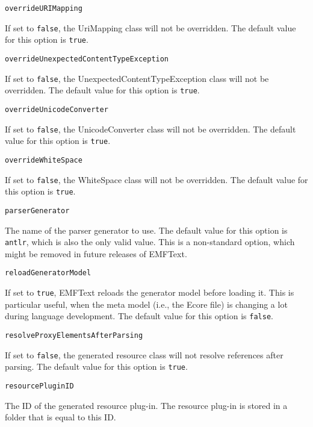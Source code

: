 \noindent\texttt{overrideURIMapping}
\begin{myindentpar}{1cm}
If set to \texttt{false}, the UriMapping class will not be overridden. The default value for this option is \texttt{true}.
\end{myindentpar}

\noindent\texttt{overrideUnexpectedContentTypeException}
\begin{myindentpar}{1cm}
If set to \texttt{false}, the UnexpectedContentTypeException class will not be overridden. The default value for this option is \texttt{true}.
\end{myindentpar}

\noindent\texttt{overrideUnicodeConverter}
\begin{myindentpar}{1cm}
If set to \texttt{false}, the UnicodeConverter class will not be overridden. The default value for this option is \texttt{true}.
\end{myindentpar}

\noindent\texttt{overrideWhiteSpace}
\begin{myindentpar}{1cm}
If set to \texttt{false}, the WhiteSpace class will not be overridden. The default value for this option is \texttt{true}.
\end{myindentpar}

\noindent\texttt{parserGenerator}
\begin{myindentpar}{1cm}
The name of the parser generator to use. The default value for this option is \texttt{antlr}, which is also the only valid value. This is a non-standard option, which might be removed in future releases of EMFText.
\end{myindentpar}

\noindent\texttt{reloadGeneratorModel}
\begin{myindentpar}{1cm}
If set to \texttt{true}, EMFText reloads the generator model before loading it. This is particular useful, when the meta model (i.e., the Ecore file) is changing a lot during language development. The default value for this option is \texttt{false}.
\end{myindentpar}

\noindent\texttt{resolveProxyElementsAfterParsing}
\begin{myindentpar}{1cm}
If set to \texttt{false}, the generated resource class will not resolve references after parsing. The default value for this option is \texttt{true}.
\end{myindentpar}

\noindent\texttt{resourcePluginID}
\begin{myindentpar}{1cm}
The ID of the generated resource plug-in. The resource plug-in is stored in a folder that is equal to this ID.
\end{myindentpar}

